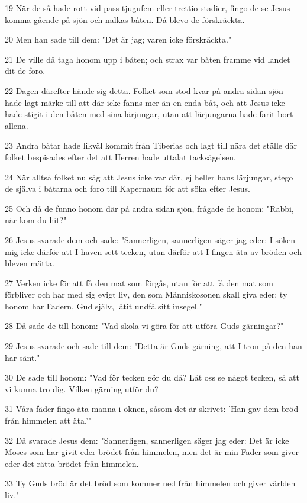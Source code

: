 \par 19 När de så hade rott vid pass tjugufem eller trettio stadier, fingo de se Jesus komma gående på sjön och nalkas båten. Då blevo de förskräckta.
\par 20 Men han sade till dem: "Det är jag; varen icke förskräckta."
\par 21 De ville då taga honom upp i båten; och strax var båten framme vid landet dit de foro.
\par 22 Dagen därefter hände sig detta. Folket som stod kvar på andra sidan sjön hade lagt märke till att där icke fanns mer än en enda båt, och att Jesus icke hade stigit i den båten med sina lärjungar, utan att lärjungarna hade farit bort allena.
\par 23 Andra båtar hade likväl kommit från Tiberias och lagt till nära det ställe där folket bespisades efter det att Herren hade uttalat tacksägelsen.
\par 24 När alltså folket nu såg att Jesus icke var där, ej heller hans lärjungar, stego de själva i båtarna och foro till Kapernaum för att söka efter Jesus.
\par 25 Och då de funno honom där på andra sidan sjön, frågade de honom: "Rabbi, när kom du hit?"
\par 26 Jesus svarade dem och sade: "Sannerligen, sannerligen säger jag eder: I söken mig icke därför att I haven sett tecken, utan därför att I fingen äta av bröden och bleven mätta.
\par 27 Verken icke för att få den mat som förgås, utan för att få den mat som förbliver och har med sig evigt liv, den som Människosonen skall giva eder; ty honom har Fadern, Gud själv, låtit undfå sitt insegel."
\par 28 Då sade de till honom: "Vad skola vi göra för att utföra Guds gärningar?"
\par 29 Jesus svarade och sade till dem: "Detta är Guds gärning, att I tron på den han har sänt."
\par 30 De sade till honom: "Vad för tecken gör du då? Låt oss se något tecken, så att vi kunna tro dig. Vilken gärning utför du?
\par 31 Våra fäder fingo äta manna i öknen, såsom det är skrivet: 'Han gav dem bröd från himmelen att äta.'"
\par 32 Då svarade Jesus dem: "Sannerligen, sannerligen säger jag eder: Det är icke Moses som har givit eder brödet från himmelen, men det är min Fader som giver eder det rätta brödet från himmelen.
\par 33 Ty Guds bröd är det bröd som kommer ned från himmelen och giver världen liv."
